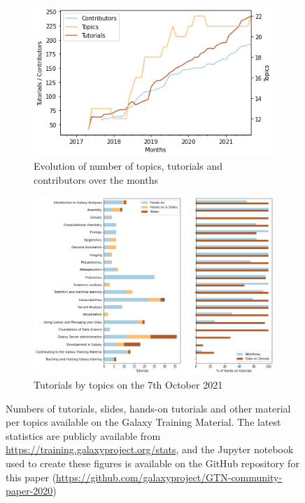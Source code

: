 \documentclass[10pt,letterpaper]{article}
\begin{document}
\begin{figure}[!ht]
    \centering
    \begin{subfigure}[b]{0.4\textwidth}
         \centering
         \includegraphics[width=\textwidth]{images/training-material-evolutions.png}
    \caption{Evolution of number of topics, tutorials and contributors over the months}
         \label{fig:material-evolution}
    \end{subfigure}
    \hfill
    \begin{subfigure}[b]{0.5\textwidth}
         \centering
         \includegraphics[width=\textwidth]{images/training-material-number.png}
         \caption{Tutorials by topics on the 7th October 2021}
         \label{fig:material-number}
    \end{subfigure}
	\caption{Numbers of tutorials, slides, hands-on tutorials and other material per topics available on the Galaxy Training Material. 
	The latest statistics are publicly available from \url{https://training.galaxyproject.org/stats}, and the Jupyter notebook used to create these figures is available on the GitHub repository for this paper (\url{https://github.com/galaxyproject/GTN-community-paper-2020})}
	\label{fig:material}
\end{figure}
\end{document}
